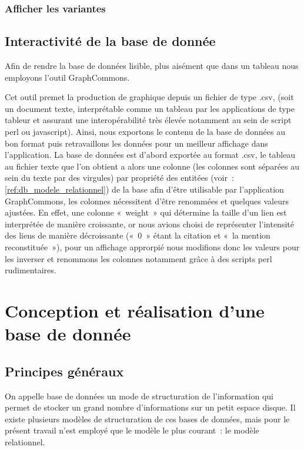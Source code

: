 \subsubsection{Afficher les variantes}

    \subsection{Interactivité de la base de donnée}
Afin de rendre la base de données lisible, plus aisément que dans un tableau nous employons l'outil GraphCommons.

Cet outil premet la production de graphique depuis un fichier de type .csv, (soit un document texte, interprétable comme un tableau par les applications de type tableur et assurant une interopérabilité très élevée notamment au sein de script perl ou javascript). Ainsi, nous exportons le contenu de la base de données au bon format puis retravaillons les données pour un meilleur affichage dans l'application.
La base de données est d'abord exportée au format .csv, le tableau au fichier texte que l'on obtient a alors une colonne (les colonnes sont séparées au sein du texte par des virgules) par propriété des entitées (voir~: \ref{ref:db_modele_relationnel}) de la base afin d'être utilisable par l'application GraphCommons, les colonnes nécessitent d'être renommées et quelques valeurs ajustées. En effet, une colonne «~weight~» qui détermine la taille d'un lien est interprétée de manière croissante, or nous avions choisi de représenter l'intensité des liens de manière décroissante («~0~» étant la citation et «~la mention reconstituée~»), pour un affichage approrpié nous modifions donc les valeurs pour les inverser et renommons les colonnes notamment grâce à des scripts perl rudimentaires.

\section{Conception et réalisation d'une base de donnée}
    \subsection{Principes généraux}
    On appelle base de données un mode de structuration de l'information qui permet de stocker un grand nombre d'informations sur un petit espace disque. Il existe plusieurs modèles de structuration de ces bases de données, mais pour le présent travail n'est employé que le modèle le plus courant~: le modèle relationnel.

